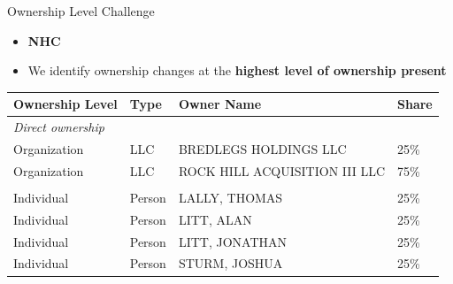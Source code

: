 \documentclass{beamer}
\begin{document}
\begin{frame}[t]{Ownership Level Challenge}
\small
\begin{itemize}
	\item \textbf{NHC}
	\item We identify ownership changes at the \textbf{highest level of ownership present}
\end{itemize}

\vspace{0.5em}
\centering
\begin{tabular}{llll}
\toprule
\textbf{Ownership Level} & \textbf{Type} & \textbf{Owner Name} & \textbf{Share} \\
\midrule
\multicolumn{4}{l}{\textit{Direct ownership}} \\
Organization & LLC & BREDLEGS HOLDINGS LLC         & 25\% \\
Organization & LLC & ROCK HILL ACQUISITION III LLC & 75\% \\
\addlinespace[0.6em]
\multicolumn{4}{l}{\textit{Indirect ownership}} \\
Individual & Person & LALLY, THOMAS   & 25\% \\
Individual & Person & LITT, ALAN      & 25\% \\
Individual & Person & LITT, JONATHAN  & 25\% \\
Individual & Person & STURM, JOSHUA   & 25\% \\
\bottomrule
\end{tabular}

\vspace{0.6em}

\end{frame}
\end{document}
